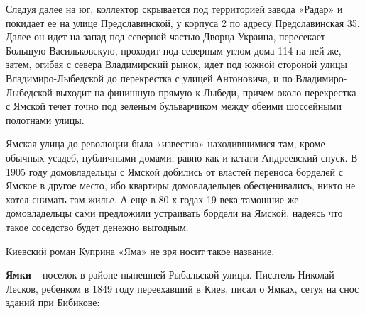 Следуя далее на юг, коллектор скрывается под территорией завода «Радар» и покидает ее на улице Предславинской, у корпуса 2 по адресу Предславинская 35. Далее он идет на запад под северной частью Дворца Украина, пересекает Большую Васильковскую, проходит под северным углом дома 114 на ней же, затем, огибая с севера Владимирский рынок, идет под южной стороной улицы Владимиро-Лыбедской до перекрестка с улицей Антоновича, и по Владимиро-Лыбедской выходит на финишную прямую к Лыбеди, причем около перекрестка с Ямской течет точно под зеленым бульварчиком между обеими шоссейными полотнами улицы.

Ямская улица до революции была «известна» находившимися там, кроме обычных усадеб, публичными домами, равно как и кстати Андреевский спуск. В 1905 году домовладельцы с Ямской добились от властей переноса борделей с Ямское в другое место, ибо квартиры домовладельцев обесценивались, никто не хотел снимать там жилье. А еще в 80-х годах 19 века тамошние же домовладельцы сами предложили устраивать бордели на Ямской, надеясь что такое соседство будет денежно выгодным.

Киевский роман Куприна «Яма» не зря носит такое название.\\

\medskip

\textbf{Ямки} – поселок в районе нынешней Рыбальской улицы. Писатель Николай Лесков, ребенком в 1849 году переехавший в Киев, писал о Ямках, сетуя на снос зданий при Бибикове:

